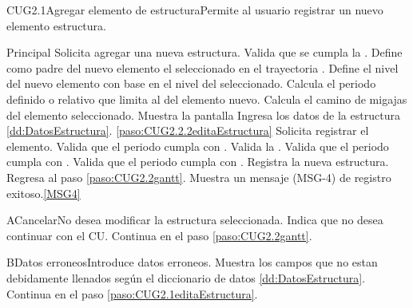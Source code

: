 	\begin{UseCase}{CUG2.1}{Agregar elemento de estructura}{Permite al usuario registrar un nuevo elemento estructura.}
	\end{UseCase}

	\begin{UCtrayectoria}{Principal}
		\UCpaso[\UCactor] Solicita agregar una nueva estructura.
		\UCpaso Valida que se cumpla la   .
		\UCpaso Define como padre del nuevo elemento el seleccionado en el  trayectoria . 
		\UCpaso Define el nivel del nuevo elemento con base en el nivel del seleccionado.
		\UCpaso Calcula el periodo definido o relativo que limita al del elemento nuevo.
		\UCpaso Calcula el camino de migajas del elemento seleccionado.
		\UCpaso Muestra la pantalla 
		\UCpaso [\UCactor] Ingresa los datos de la estructura \ref{dd:DatosEstructura}. \ref{paso:CUG2.2.2editaEstructura}
		\UCpaso [\UCactor] Solicita registrar el elemento.  
		\UCpaso Valida que el periodo cumpla con   .
		\UCpaso Valida la   .
		\UCpaso Valida que el periodo cumpla con   .
		\UCpaso Valida que el periodo cumpla con   .
		\UCpaso Registra la nueva estructura.
		\UCpaso Regresa al paso \ref{paso:CUG2.2gantt}.
		\UCpaso Muestra un mensaje (MSG-4) de registro exitoso.\ref{MSG4}
	\end{UCtrayectoria}

	\begin{UCtrayectoriaA}{A}{Cancelar}{No desea modificar la estructura seleccionada.}
		\UCpaso[\UCactor] Indica que no desea continuar con el CU.
		\UCpaso Continua en el paso \ref{paso:CUG2.2gantt}.
	\end{UCtrayectoriaA}

	\begin{UCtrayectoriaA}{B}{Datos erroneos}{Introduce datos erroneos.}
		\UCpaso Muestra los campos que no estan debidamente llenados según el diccionario de datos \ref{dd:DatosEstructura}.
		\UCpaso Continua en el paso \ref{paso:CUG2.1editaEstructura}.
	\end{UCtrayectoriaA}

